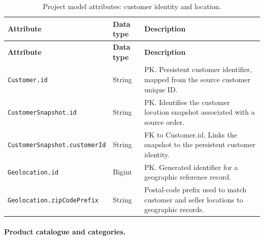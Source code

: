 \documentclass[a4paper,12pt]{article}
\newcommand{\tablestyle}{%
  \small\setstretch{1.05}%
  \renewcommand{\arraystretch}{1.25}%
  \setlength{\extrarowheight}{3pt}%
  \arrayrulecolor{tableborder}%
}
\begin{document}
{\tablestyle
\begin{longtable}{|L{5.7cm}|L{2.1cm}|L{\dimexpr\textwidth-7.8cm-6\arrayrulewidth\relax}|}
  \caption{Project model attributes: customer identity and location.}
  \label{tab:project-model-1}\\
  \hline
  \textbf{Attribute} & \textbf{Data type} & \textbf{Description} \\[3pt]\hline
  \endfirsthead
  \hline
  \textbf{Attribute} & \textbf{Data type} & \textbf{Description} \\[3pt]\hline
  \endhead
  \endfoot
  \endlastfoot
  \nolinkurl{Customer.id} & String & PK. Persistent customer identifier, mapped from the source customer unique ID. \\[3pt]\hline
  \nolinkurl{CustomerSnapshot.id} & String & PK. Identifies the customer location snapshot associated with a source order. \\[3pt]\hline
  \nolinkurl{CustomerSnapshot.customerId} & String & FK to Customer.id. Links the snapshot to the persistent customer identity. \\[3pt]\hline
  \nolinkurl{Geolocation.id} & Bigint & PK. Generated identifier for a geographic reference record. \\[3pt]\hline
  \nolinkurl{Geolocation.zipCodePrefix} & String & Postal-code prefix used to match customer and seller locations to geographic records. \\[3pt]\hline
\end{longtable}
}

\paragraph{Product catalogue and categories.}
\end{document}
